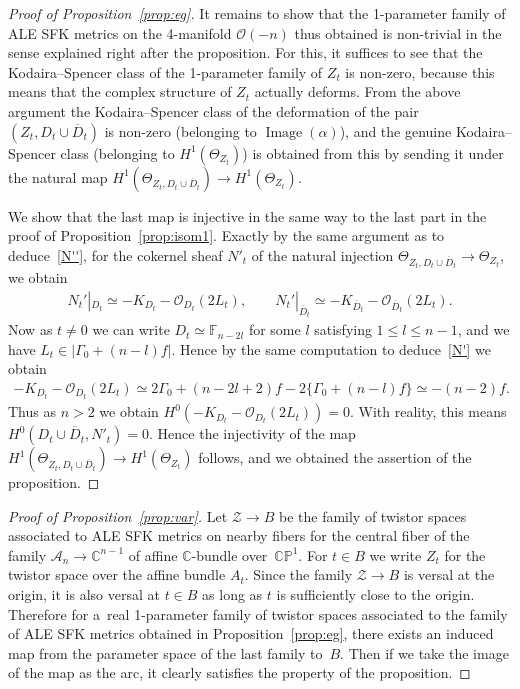 \documentclass[pdftex]{sigma}
\numberwithin{equation}{section}
\DeclareMathOperator{\Image}{Image}
\begin{document}
\begin{proof}[Proof of Proposition~\ref{prop:eg}]
It remains to show that the 1-parameter family of ALE SFK metrics on the 4-manifold $\mathscr O(-n)$ thus obtained is
non-trivial in the sense explained right after the proposition.
For this, it suf\/f\/ices to see that the Kodaira--Spencer class of the 1-parameter family of $Z_t$ is non-zero, because
this means that the complex structure of $Z_t$ actually deforms.
From the above argument the Kodaira--Spencer class of the deformation of the pair $(Z_t,D_t\cup\overline D_t)$ is
non-zero (belonging to $\Image(\alpha)$), and the genuine Kodaira--Spencer class (belonging to $H^1(\Theta_{Z_t})$) is
obtained from this by sending it under the natural map $H^1(\Theta_{Z_t,D_t\cup\overline D_t})\to H^1(\Theta_{Z_t})$.

We show that the last map is injective in the same way to the last part in the proof of Proposition~\ref{prop:isom1}.
Exactly by the same argument as to deduce~\eqref{N''}, for the cokernel sheaf $N'_t$ of the natural injection
$\Theta_{Z_t,D_t\cup\overline D_t} \to \Theta_{Z_t}$, we obtain
\begin{gather*}
N_t'|_{D_t}\simeq -K_{D_t}-\mathscr O_{D_t}(2L_t),
\qquad
N_t'|_{\overline D_t}\simeq -K_{\overline D_t}-\mathscr O_{\overline D_t}(2L_t).
\end{gather*}
Now as $t\neq 0$ we can write $D_t\simeq\mathbb{F}_{n-2l}$ for some $l$ satisfying $1\le l\le n-1$, and we have $L_t\in
|\Gamma_0+(n-l)f|$.
Hence by the same computation to deduce~\eqref{N'} we obtain
\begin{gather*}%
-K_{D_t}-\mathscr O_{D_t}(2L_t) \simeq 2\Gamma_0+(n-2l+2)f -2\{\Gamma_0 + (n-l)f\}
\simeq -(n-2)f.
\end{gather*}
Thus as $n\!>\!2$ we obtain $H^0(-K_{D_t}\!-\mathscr O_{D_t}(2L_t))\!=\!0$.
With reality, this means \mbox{$H^0(D_t\!\cup\! \overline D_t,N'_t)\!=\!0$}.
Hence the injectivity of the map $H^1(\Theta_{Z_t,D_t\cup\overline D_t})\to H^1(\Theta_{Z_t})$ follows, and we obtained
the assertion of the proposition.
\end{proof}

\begin{proof}[Proof of Proposition~\ref{prop:var}]
Let $\mathscr Z\to B$ be the family of twistor spaces associated to ALE SFK
metrics on nearby f\/ibers for the central f\/iber of the family $\mathscr A_n\to \mathbb{C}^{n-1}$ of af\/f\/ine
$\mathbb{C}$-bundle over~$\mathbb{CP}^1$.
For $t\in B$ we write $Z_t$ for the twistor space over the af\/f\/ine bundle $A_t$.
Since the family $\mathscr Z\to B$ is versal at the origin, it is also versal at $t\in B$ as long as $t$ is
suf\/f\/iciently close to the origin.
Therefore for a~real 1-parameter family of twistor spaces associated to the family of ALE SFK metrics obtained in
Proposition~\ref{prop:eg}, there exists an induced map from the parameter space of the last family to~$B$.
Then if we take the image of the map as the arc, it clearly satisf\/ies the property of the proposition.
\end{proof}
\end{document}
